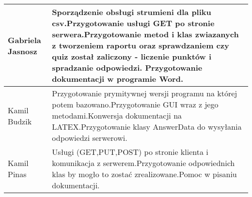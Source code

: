 \documentclass[a4paper]{article}
\begin{document}
\setlength{\arrayrulewidth}{0.6mm}
\setlength{\tabcolsep}{12pt}
\renewcommand{\arraystretch}{1.5}
\Large
\begin{tabular}{ |p{4cm}|p{12cm}| }
\hline
Gabriela Jasnosz& Sporządzenie obsługi strumieni dla pliku csv.\newline Przygotowanie usługi GET po stronie serwera.\newline Przygotowanie metod i klas zwiazanych z tworzeniem raportu oraz sprawdzaniem czy quiz został zaliczony - liczenie punktów i spradzanie odpowiedzi. \newline Przygotowanie dokumentacji w programie Word.\\
\hline

Kamil Budzik& Przygotowanie prymitywnej wersji programu na której potem bazowano.\newline Przygotowanie GUI wraz z jego metodami.\newline Konwersja dokumentacji na LATEX.\newline Przygotowanie klasy AnswerData do wysyłania odpowiedzi serwerowi.
\\
\hline

Kamil Pinas& Usługi (GET,PUT,POST) po stronie klienta i komunikacja z serwerem.\newline Przygotowanie odpowiednich klas by mogło to zostać zrealizowane.\newline Pomoc w pisaniu dokumentacji. \\
\hline
\end{tabular}
\end{document}
